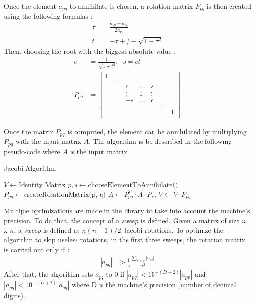 \documentclass{book}
\begin{document}
Once the element $a_{pq}$ to annihilate is chosen, a rotation matrix $P_{pq}$ is then created using the following formulas :
\begin{align*}
    \tau &= \frac{a_{qq} - a_{pp}}{2a_{pq}} \\
    t &= -\tau +/- \sqrt{1 - \tau^2}
\end{align*}
Then, choosing the root with the biggest absolute value :
\begin{align*}
    c &= \frac{1}{\sqrt{1 + t^2}}, \; \; s = ct \\
    P_{pq} &=
        \begin{bmatrix}
            1 & & & & & & \\
            & \ldots & & & & & \\
            & & c & \ldots & s & \\
            & & \vdots & 1 & \vdots & \\
            & & -s & \ldots & c & \\
            & & & & & \ldots & \\
            & & & & & & 1 \\
        \end{bmatrix}
\end{align*}

Once the matrix $P_{pq}$ is computed, the element can be annihilated by multiplying $P_{pq}$ with the input matrix $A$. The algorithm is be described in the following pseudo-code where $A$ is the input matrix: \\

\begin{algorithm}
  \caption{Jacobi Algorithm}
  \begin{algorithmic}[1]
    \State $V \gets \text{Identity Matrix}$
        \State $p, q \gets \text{chooseElementToAnnihilate()}$ 
        \State $P_{pq} \gets \text{createRotationMatrix(p, q)}$
        \State $A \gets P_{pq}^{T} \cdot A \cdot P_{pq}$
        \State $V \gets V \cdot P_{pq}$
    \EndFor
  \end{algorithmic}
\end{algorithm}

Multiple optimizations are made in the library to take into account the machine's precision. To do that, the concept of a \textit{sweep} is defined. Given a matrix of size $n$ x $n$, a \textit{sweep} is defined as $n (n - 1) / 2$ Jacobi rotations. To optimize the algorithm to skip useless rotations, in the first three sweeps, the rotation matrix is carried out only if :
\begin{align*}
    |a_{pq}| &> \frac{1}{5}\frac{\sum_{r<s}|a_{rs}|}{n^2}
\end{align*}
After that, the algorithm sets $a_{pq}$ to 0 if $|a_{pq}| < 10^{-(D+2)}|a_{pp}|$ and $|a_{pq}| < 10^{-(D+2)}|a_{qq}|$ where D is the machine's precision (number of decimal digits).
\end{document}
